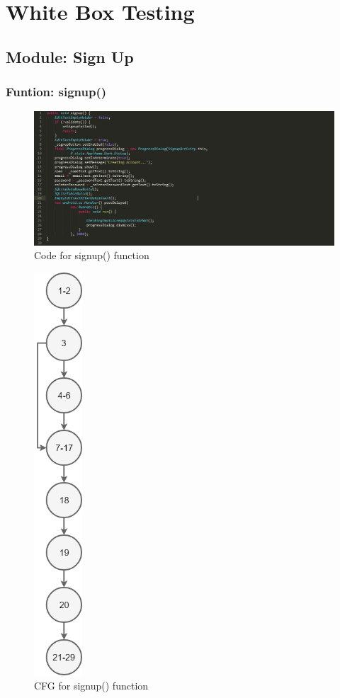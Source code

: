 \documentclass{scrreprt}
\begin{document}
\chapter{White Box Testing}


\section{Module: Sign Up}
\subsection{Funtion: signup()}
\begin{figure}[H]
\centering
\includegraphics[width=\textwidth, keepaspectratio]{signupCode.png}
\caption{Code for signup() function}
\end{figure}

\begin{figure}[H]
\centering
\includegraphics[width=0.16\textwidth, keepaspectratio]{signup.png}
\caption{CFG for signup() function}
\end{figure}
\end{document}
